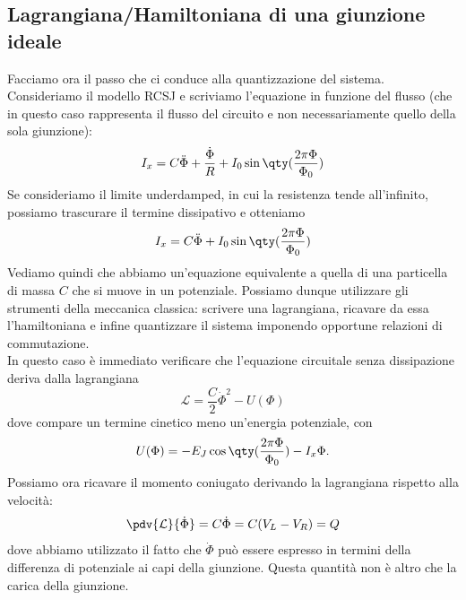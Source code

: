 \subsection{Lagrangiana/Hamiltoniana di una giunzione ideale}
Facciamo ora il passo che ci conduce alla quantizzazione del sistema.\\
Consideriamo il modello RCSJ e scriviamo l'equazione in funzione del flusso (che in questo caso rappresenta il flusso del circuito e non necessariamente quello della sola giunzione):
\begin{equation*}
    I_x
    =
    C\ddot{\Phi}
    +
    \frac{\dot{\Phi}}{R}
    +
    I_0
    \sin{
        \qty(
            \frac{2\pi\Phi}{\Phi_0}
        )
    }
\end{equation*}
Se consideriamo il limite underdamped, in cui la resistenza tende all'infinito, possiamo trascurare il termine dissipativo e otteniamo
\begin{equation*}
    I_x
    =
    C\ddot{\Phi}
    +
    I_0
    \sin{
        \qty(
            \frac{2\pi\Phi}{\Phi_0}
        )
    }
\end{equation*}
Vediamo quindi che abbiamo un'equazione equivalente a quella di una particella di massa $C$ che si muove in un potenziale. Possiamo dunque utilizzare gli strumenti della meccanica classica: scrivere una lagrangiana, ricavare da essa l'hamiltoniana e infine quantizzare il sistema imponendo opportune relazioni di commutazione.\\
In questo caso è immediato verificare che l'equazione circuitale senza dissipazione deriva dalla lagrangiana
\begin{equation*}
    \mathcal{L}
    =
    \frac{C}{2}\dot{\Phi}^2
    -
    U(\Phi)
\end{equation*}
dove compare un termine cinetico meno un'energia potenziale, con
\begin{equation*}
    U(\Phi)
    =
    -
    E_J
    \cos{
        \qty(
            \frac{2\pi\Phi}{\Phi_0}
        )
    }
    -
    I_x\Phi.
\end{equation*}
Possiamo ora ricavare il momento coniugato derivando la lagrangiana rispetto alla velocità:
\begin{equation*}
    \pdv{\mathcal{L}}{\dot{\Phi}}
    =
    C\dot{\Phi}
    =
    C(V_L-V_R)
    =
    Q
\end{equation*}
dove abbiamo utilizzato il fatto che $\dot{\Phi}$ può essere espresso in termini della differenza di potenziale ai capi della giunzione. Questa quantità non è altro che la carica della giunzione.\\
